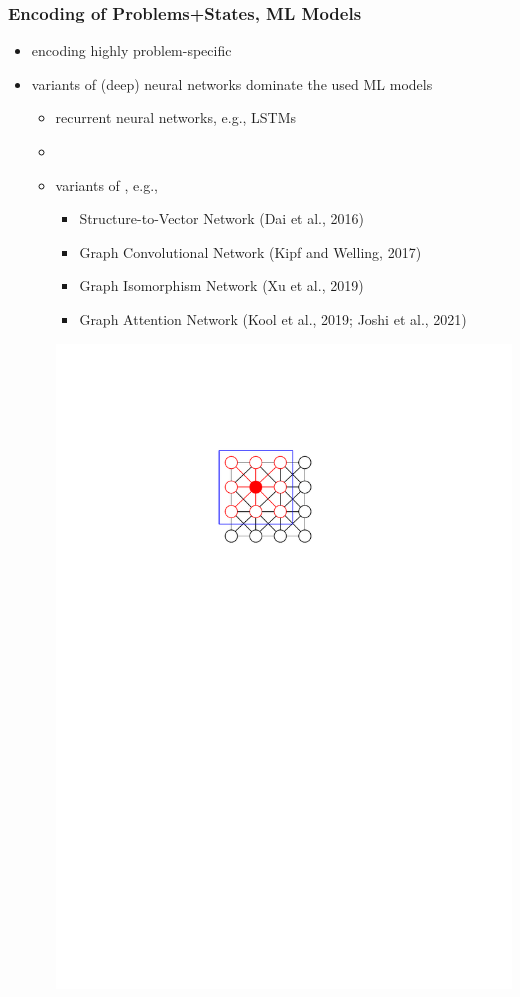 \documentclass[aspectratio=1610]{beamer}
\newcommand{\important}[1]{{\color{green!60!black}#1}}
\begin{document}
\begin{frame}
	\frametitle{Encoding of Problems+States, ML Models}

	\begin{itemize}
		\itemsep3ex
		\item encoding highly problem-specific
		\item variants of (deep) neural networks dominate the used ML models
		\begin{itemize}
			\itemsep1.3ex
			\item recurrent neural networks, e.g., LSTMs
			\item {} \citep{vinyals-2015}
			\item variants of  \citep{scarselli2008graph}, e.g.,
			\begin{itemize}
				\item Structure-to-Vector Network (Dai et al., 2016)
				\item Graph Convolutional Network (Kipf and Welling, 2017)
				\item Graph Isomorphism Network (Xu et al., 2019)
				\item Graph Attention Network (Kool et al., 2019; Joshi et al., 2021)
			\end{itemize}
			{\includegraphics[width=0.7\linewidth, page=3]{figures/graphics.pdf}}\\
		\end{itemize} 
	\end{itemize}
\end{frame}
\end{document}
